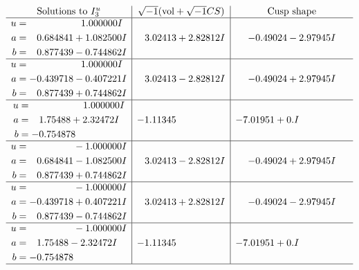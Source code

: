 \documentclass[1p]{elsarticle_modified}
\theoremstyle{definition}
\newcommand{\I}{\sqrt{-1}}
\begin{document}
$$\begin{array}{c|c|c}  
\text{Solutions to }I^u_{3}& \I (\text{vol} + \sqrt{-1}CS) & \text{Cusp shape}\\
 \hline 
\begin{aligned}
u &= \phantom{-0.000000 -}1.000000 I \\
a &= \phantom{-}0.684841 + 1.082500 I \\
b &= \phantom{-}0.877439 - 0.744862 I\end{aligned}
 & \phantom{-}3.02413 + 2.82812 I & -0.49024 - 2.97945 I \\ \hline\begin{aligned}
u &= \phantom{-0.000000 -}1.000000 I \\
a &= -0.439718 - 0.407221 I \\
b &= \phantom{-}0.877439 + 0.744862 I\end{aligned}
 & \phantom{-}3.02413 - 2.82812 I & -0.49024 + 2.97945 I \\ \hline\begin{aligned}
u &= \phantom{-0.000000 -}1.000000 I \\
a &= \phantom{-}1.75488 + 2.32472 I \\
b &= -0.754878\phantom{ +0.000000I}\end{aligned}
 & -1.11345\phantom{ +0.000000I} & -7.01951 + 0. I\phantom{ +0.000000I} \\ \hline\begin{aligned}
u &= \phantom{-0.000000 } -1.000000 I \\
a &= \phantom{-}0.684841 - 1.082500 I \\
b &= \phantom{-}0.877439 + 0.744862 I\end{aligned}
 & \phantom{-}3.02413 - 2.82812 I & -0.49024 + 2.97945 I \\ \hline\begin{aligned}
u &= \phantom{-0.000000 } -1.000000 I \\
a &= -0.439718 + 0.407221 I \\
b &= \phantom{-}0.877439 - 0.744862 I\end{aligned}
 & \phantom{-}3.02413 + 2.82812 I & -0.49024 - 2.97945 I \\ \hline\begin{aligned}
u &= \phantom{-0.000000 } -1.000000 I \\
a &= \phantom{-}1.75488 - 2.32472 I \\
b &= -0.754878\phantom{ +0.000000I}\end{aligned}
 & -1.11345\phantom{ +0.000000I} & -7.01951 + 0. I\phantom{ +0.000000I}\\
 \hline 
 \end{array}$$\newpage
\end{document}
